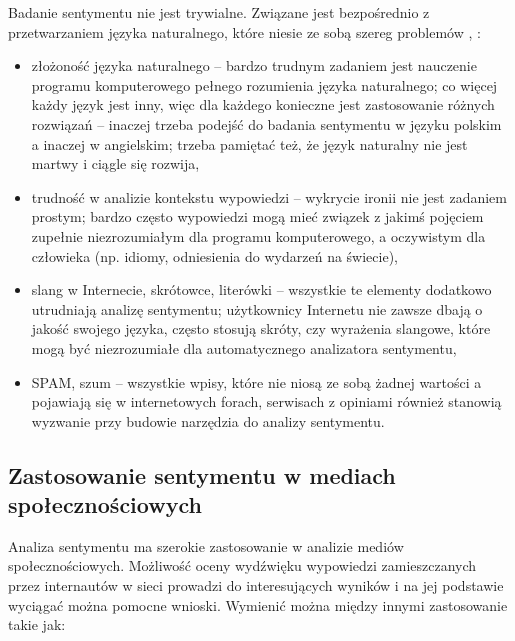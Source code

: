 Badanie sentymentu nie jest trywialne. Związane jest bezpośrednio z 
przetwarzaniem języka naturalnego, które niesie ze sobą szereg problemów
\cite{ChallengeOfSpokenLanguage}, \cite{NaturalLanguageProcessingFuture}:

\begin{itemize}
  \item złożoność języka naturalnego -- bardzo trudnym zadaniem jest nauczenie 
  programu komputerowego pełnego rozumienia języka naturalnego; co więcej każdy
  język jest inny, więc dla każdego konieczne jest zastosowanie różnych
  rozwiązań -- inaczej trzeba podejść do badania sentymentu w języku polskim
  a inaczej w angielskim; trzeba pamiętać też, że język naturalny nie jest
  martwy i ciągle się rozwija,

  \item trudność w analizie kontekstu wypowiedzi -- wykrycie ironii nie jest
  zadaniem prostym; bardzo często wypowiedzi mogą mieć związek z jakimś pojęciem
  zupełnie niezrozumiałym dla programu komputerowego, a oczywistym dla człowieka
  (np. idiomy, odniesienia do wydarzeń na świecie),

  \item slang w Internecie, skrótowce, literówki -- wszystkie te elementy
  dodatkowo utrudniają analizę sentymentu; użytkownicy Internetu nie zawsze
  dbają o jakość swojego języka, często stosują skróty, czy wyrażenia slangowe,
  które mogą być niezrozumiałe dla automatycznego analizatora sentymentu,

  \item SPAM, szum -- wszystkie wpisy, które nie niosą ze sobą żadnej wartości
  a pojawiają się w internetowych forach, serwisach z opiniami również stanowią
  wyzwanie przy budowie narzędzia do analizy sentymentu.

\end{itemize}





\subsection{Zastosowanie sentymentu w mediach społecznościowych}
Analiza sentymentu ma szerokie zastosowanie w analizie mediów społecznościowych.
Możliwość oceny wydźwięku wypowiedzi zamieszczanych przez internautów w sieci
prowadzi do interesujących wyników i na jej podstawie wyciągać można pomocne
wnioski. Wymienić można między innymi zastosowanie takie jak:

